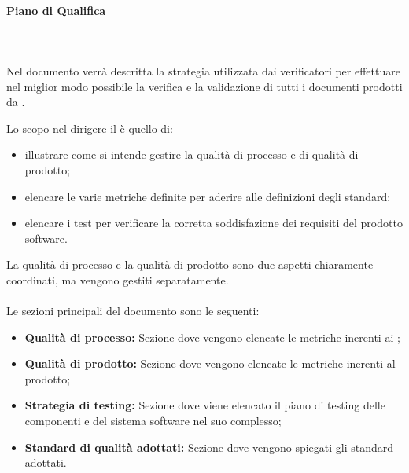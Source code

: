 \paragraph{Piano di Qualifica}\mbox{}
\\\\Nel documento \PdQ{} verrà descritta la strategia utilizzata dai verificatori per effettuare nel miglior modo possibile la verifica e la validazione di tutti i documenti prodotti da \Gruppo{}.

Lo scopo nel dirigere il \PdQ{} è quello di:
\begin{itemize}
	\item illustrare come si intende gestire la qualità di processo e di qualità di prodotto;
	\item elencare le varie metriche definite per aderire alle definizioni degli standard;
	\item elencare i test per verificare la corretta soddisfazione dei requisiti del prodotto software.
\end{itemize}

La qualità di processo e la qualità di prodotto sono due aspetti chiaramente coordinati, ma vengono gestiti separatamente. \\ \\
Le sezioni principali del documento sono le seguenti:
\begin{itemize}
    \item \textbf{Qualità di processo:} Sezione dove vengono elencate le metriche inerenti ai ;
    \item \textbf{Qualità di prodotto:} Sezione dove vengono elencate le metriche inerenti al prodotto;
    \item \textbf{Strategia di testing:} Sezione dove viene elencato il piano di testing delle componenti e del sistema software nel suo complesso;
    \item \textbf{Standard di qualità adottati:} Sezione dove vengono spiegati gli standard adottati.
\end{itemize}
